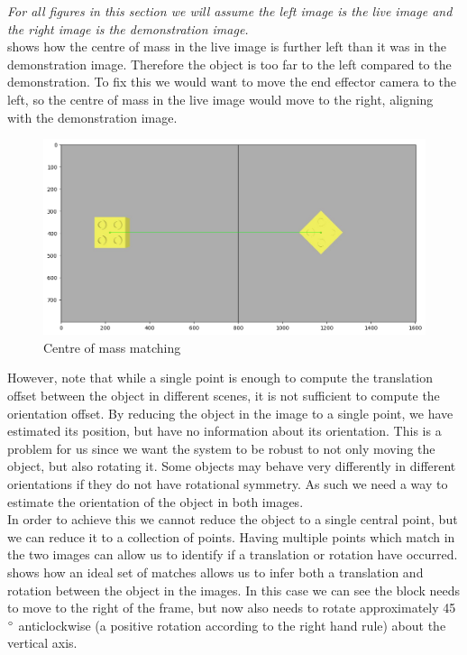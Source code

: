\textit{For all figures in this section we will assume the left image is the live image and the right image is the demonstration image.}\\

 shows how the centre of mass in the live image is further left than it was in the demonstration image. Therefore the object is too far to the left compared to the demonstration. To fix this we would want to move the end effector camera to the left, so the centre of mass in the live image would move to the right, aligning with the demonstration image.

\begin{figure}[h]
    \centering
    \includegraphics[width=\textwidth]{figures/ideal_centre-of-mass.png}
    \caption{Centre of mass matching}
    \label{fig:centre-of-mass}
\end{figure}

However, note that while a single point is enough to compute the translation offset between the object in different scenes, it is not sufficient to compute the orientation offset. By reducing the object in the image to a single point, we have estimated its position, but have no information about its orientation. This is a problem for us since we want the system to be robust to not only moving the object, but also rotating it. Some objects may behave very differently in different orientations if they do not have rotational symmetry. As such we need a way to estimate the orientation of the object in both images.\\

In order to achieve this we cannot reduce the object to a single central point, but we can reduce it to a collection of points. Having multiple points which match in the two images can allow us to identify if a translation or rotation have occurred.  shows how an ideal set of matches allows us to infer both a translation and rotation between the object in the images. In this case we can see the block needs to move to the right of the frame, but now also needs to rotate approximately 45$\operatorname{^{\circ}}$ anticlockwise (a positive rotation according to the right hand rule) about the vertical axis.

